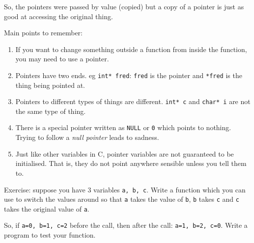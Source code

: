 So, the pointers were passed by value (copied) but a copy of a pointer is just as good at accessing the original thing.

Main points to remember:
\begin{enumerate}
 \item If you want to change something outside a function from inside the function, you may need to use a pointer.
 \item Pointers have two ends. eg \lstinline!int* fred!:   \texttt{fred} is the pointer and \texttt{*fred} is the thing 
 being pointed at.
 \item Pointers to different types of things are different. \lstinline!int* c! and \lstinline!char* i! are not the same type of thing.
 \item There is a special pointer written as \texttt{NULL} or \texttt{0} which points to nothing.
 Trying to follow a \emph{null pointer} leads to sadness.
 \item Just like other variables in C, pointer variables are not guaranteed to be initialised.
 That is, they do not point anywhere sensible unless you tell them to.
\end{enumerate}


Exercise: suppose you have 3 variables \texttt{a, b, c}.
Write a function which you can use to switch the values around so that 
\texttt{a} takes the value of \texttt{b}, \texttt{b} takes \texttt{c}
and \texttt{c} takes the original value of \texttt{a}.

So, if \lstinline{a=0, b=1, c=2} before the call, then after the call:
\lstinline{a=1, b=2, c=0}.
Write a program to test your function.



